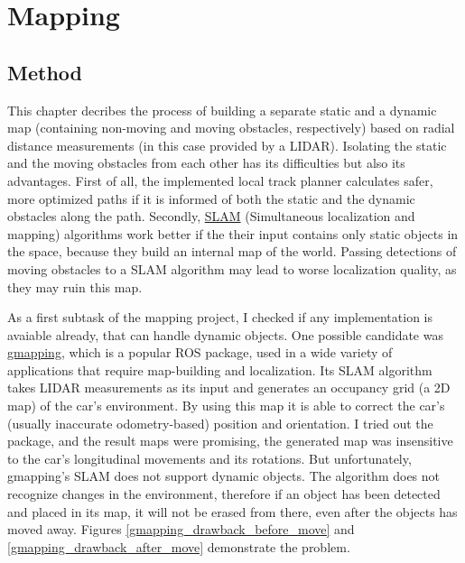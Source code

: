\chapter{Mapping}

\section{Method}
This chapter decribes the process of building a separate static and a dynamic map (containing non-moving and moving obstacles, respectively) based on radial distance measurements (in this case provided by a LIDAR). Isolating the static and the moving obstacles from each other has its difficulties but also its advantages. First of all, the implemented local track planner calculates safer, more optimized paths if it is informed of both the static and the dynamic obstacles along the path. Secondly, \href{https://en.wikipedia.org/wiki/Simultaneous_localization_and_mapping}{SLAM} (Simultaneous localization and mapping) algorithms work better if the their input contains only static objects in the space, because they build an internal map of the world. Passing detections of moving obstacles to a SLAM algorithm may lead to worse localization quality, as they may ruin this map.

As a first subtask of the mapping project, I checked if any implementation is avaiable already, that can handle dynamic objects. One possible candidate was \href{http://wiki.ros.org/gmapping}{gmapping}, which is a popular ROS package, used in a wide variety of applications that require map-building and localization. Its SLAM algorithm takes LIDAR measurements as its input and generates an occupancy grid (a 2D map) of the car's environment. By using this map it is able to correct the car's (usually inaccurate odometry-based) position and orientation. I tried out the package, and the result maps were promising, the generated map was insensitive to the car's longitudinal movements and its rotations. But unfortunately, gmapping's SLAM does not support dynamic objects. The algorithm does not recognize changes in the environment, therefore if an object has been detected and placed in its map, it will not be erased from there, even after the objects has moved away. Figures \ref{gmapping_drawback_before_move} and \ref{gmapping_drawback_after_move} demonstrate the problem.

